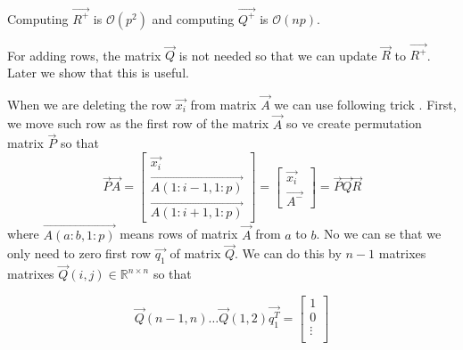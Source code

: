 Computing $\vec{R^{+}}$ is $\mathcal{O}(p^2)$ and computing $\vec{Q^{+}}$ is $\mathcal{O}(np)$.

\begin{note} \label{qnotrequired}
    For adding rows, the matrix $\vec{Q}$ is not needed so that we can update $\vec{R}$ to $\vec{R^{+}}$. Later we show that this is useful. 
\end{note}




When we are deleting the row $\vec{x_i}$ from matrix $\vec{A}$ we can use following trick 
\cite{hammarling2008updatingqr}. First, we move such row as the first row of the matrix $\vec{A}$ so ve create permutation matrix $\vec{P}$ so that 
\begin{equation}
    \vec{P}\vec{A} = \begin{bmatrix}
        \vec{x_i} \\
        \vec{A(1:i-1 , 1:p)} \\
        \vec{A(1:i+1 , 1:p)} 
    \end{bmatrix}
    = 
    \begin{bmatrix}
        \vec{x_i} \\
        \vec{A^{-}}
    \end{bmatrix}
    = \vec{P}\vec{Q}\vec{R}
\end{equation} 
where $\vec{A(a:b , 1:p)} $ means rows of matrix $\vec{A}$ from $a$ to $b$.
No we can se that we only need to zero first row $\vec{q_1}$ of matrix $\vec{Q}$. We can do this by $n-1$ matrixes matrixes $\vec{Q}(i,j) \in \mathbb{R}^{n \times n}$ so that

\begin{equation}
    \vec{Q}(n-1,n) \ldots \vec{Q}(1,2)\vec{q_1^T} =     \begin{bmatrix}
        1 \\
        0\\
        \vdots \\
    \end{bmatrix}
\end{equation}

